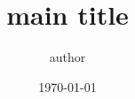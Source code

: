 \usepackage[a4paper, top=40mm, bottom=40mm, left=40mm, right=40mm]{geometry}
\usepackage{amssymb}
\usepackage{amsmath}
\usepackage{textcomp}
\usepackage{gensymb}
\usepackage{pgfplots}
\usepackage{fancyhdr}
\usepackage[backend=biber]{biblatex}
\usepackage[hidelinks]{hyperref}


\pgfplotsset{compat=newest}
\pgfplotsset{samples = 500}

\pagestyle{fancy}
\setlength{\headheight}{28pt}
\fancyhf{}
\rhead{}
\lhead{}
\rfoot{\thepage}
\lfoot{}
\renewcommand{\headrulewidth}{0pt}
\renewcommand{\footrulewidth}{0pt}



\title{main title}
\date{\today}
\author{author}